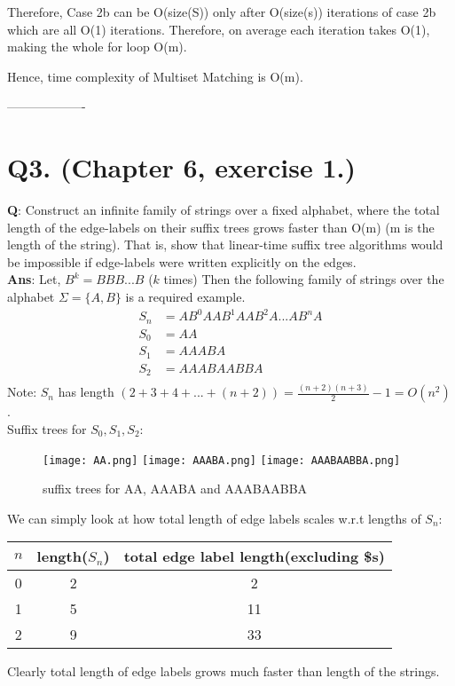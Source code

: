 \documentclass[a4paper,11pt]{article}
\begin{document}
Therefore, Case 2b can be O(size(S)) only after O(size(s)) iterations of case 2b which are all O(1) iterations. Therefore, on average each iteration takes O(1), making the whole for loop O(m).

Hence, time complexity of Multiset Matching is O(m).
\begin{center}
 -------------------
\end{center}
\section*{Q3. (Chapter 6, exercise 1.)}
\textbf{Q}: Construct an infinite family of strings over a fixed alphabet, where the total length of the
edge-labels on their suffix trees grows faster than O(m) (m is the length of the string). That
is, show that linear-time suffix tree algorithms would be impossible if edge-labels were
written explicitly on the edges.
\\
\textbf{Ans}: Let, $B^k = BBB...B$ ($k$ times)
Then the following  family of strings over the alphabet $\Sigma = \{A,B\}$ is a required example. 
\begin{align*}
 S_n  &= AB^0AAB^1AAB^2A...AB^nA \\
 S_0 &= AA\\
 S_1 &= AAABA\\
 S_2 &= AAABAABBA\\
\end{align*}
Note: $S_n$ has length $(2 + 3 + 4 + ... + (n+2)) = \frac{(n+2)(n+3)}{2}-1 = O(n^2)$.\\Suffix trees for $S_0,S_1, S_2$:
\begin{figure}[H]

\centering
\texttt{[image: AA.png]}\hfill
\texttt{[image: AAABA.png]}\hfill
\texttt{[image: AAABAABBA.png]}

\caption{suffix trees for AA, AAABA and AAABAABBA}

\label{fig:figure3}
\end{figure}
We can simply look at how total length of edge labels scales w.r.t lengths of $S_n$:
\begin{center}
\begin{tabular}{ | c | c | c | }
\hline
$n$ & length($S_n$) & total edge label length(excluding \$s) \\ 
\hline
\hline
 0 & 2 & 2\\
 \hline
 1 & 5 & 11 \\  
 \hline
 2 & 9 & 33 \\   
\hline
 \end{tabular}
\end{center}
Clearly total length of edge labels grows much faster than length of the strings.
\end{document}
